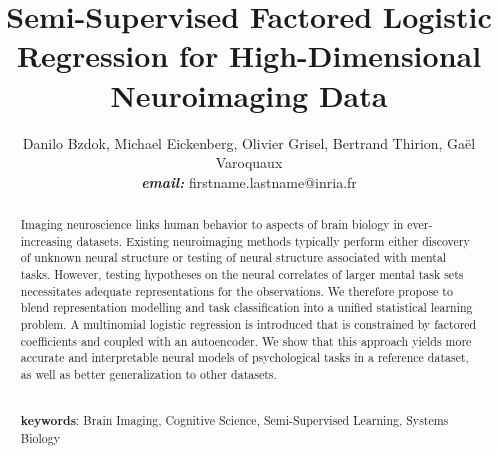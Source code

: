 \documentclass{article} %
\title{Semi-Supervised Factored Logistic Regression for
High-Dimensional Neuroimaging Data}
\begin{document}
\author{Danilo Bzdok, Michael Eickenberg, Olivier Grisel,
  Bertrand Thirion,
  Ga\"el Varoquaux \\\textbf{\textit{email:} }firstname.lastname@inria.fr}

\maketitle

\begin{abstract}
Imaging neuroscience links human behavior to aspects of brain
biology in ever-increasing datasets.
%
Existing neuroimaging methods typically perform either discovery of unknown
neural structure or testing of neural structure associated with mental tasks.
%
However, testing hypotheses on the neural correlates of
larger mental task sets
necessitates adequate representations for the observations.
%
We therefore propose to blend
representation modelling and task classification into
a unified statistical learning problem.
%
A multinomial logistic regression is introduced that is
constrained by factored coefficients and coupled with an autoencoder.
%
We show that this approach yields more accurate and interpretable
neural models of psychological tasks in a reference dataset,
as well as better generalization to other datasets.
%


\textbf{\\keywords}: Brain Imaging, Cognitive Science, Semi-Supervised Learning, Systems Biology

\end{abstract}
\end{document}
